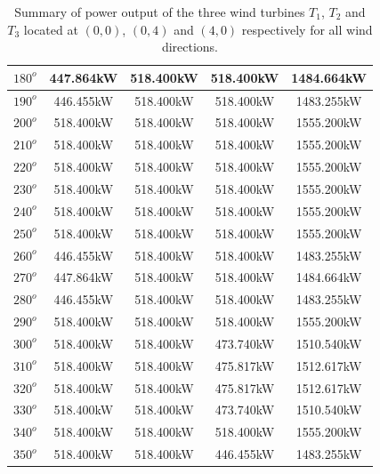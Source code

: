 \begin{table}[H]
\begin{tabular}{|c|c|c|c|c|}
	        $180^{o}$ & 447.864kW & 518.400kW & 518.400kW & 1484.664kW  \\
	        \hline
	        $190^{o}$ & 446.455kW & 518.400kW & 518.400kW & 1483.255kW  \\
	        \hline
	        $200^{o}$ & 518.400kW & 518.400kW & 518.400kW & 1555.200kW  \\
	        \hline
	        $210^{o}$ & 518.400kW & 518.400kW & 518.400kW & 1555.200kW  \\
	        \hline
	        $220^{o}$ & 518.400kW & 518.400kW & 518.400kW & 1555.200kW  \\
	        \hline
	        $230^{o}$ & 518.400kW & 518.400kW & 518.400kW & 1555.200kW  \\
	        \hline
	        $240^{o}$ & 518.400kW & 518.400kW & 518.400kW & 1555.200kW  \\
	        \hline
	        $250^{o}$ & 518.400kW & 518.400kW & 518.400kW & 1555.200kW  \\
	        \hline
	        $260^{o}$ & 446.455kW & 518.400kW & 518.400kW & 1483.255kW  \\
	        \hline
	        $270^{o}$ & 447.864kW & 518.400kW & 518.400kW & 1484.664kW   \\
	        \hline
	        $280^{o}$ & 446.455kW & 518.400kW & 518.400kW & 1483.255kW  \\
	        \hline
	        $290^{o}$ & 518.400kW & 518.400kW & 518.400kW & 1555.200kW  \\
	        \hline
	        $300^{o}$ & 518.400kW & 518.400kW & 473.740kW & 1510.540kW  \\
	        \hline
	        $310^{o}$ & 518.400kW & 518.400kW & 475.817kW & 1512.617kW  \\
	        \hline
	        $320^{o}$ & 518.400kW & 518.400kW & 475.817kW & 1512.617kW  \\
	        \hline
	        $330^{o}$ & 518.400kW & 518.400kW & 473.740kW & 1510.540kW  \\
	        \hline
	        $340^{o}$ & 518.400kW & 518.400kW & 518.400kW & 1555.200kW  \\
	        \hline
	        $350^{o}$ & 518.400kW & 518.400kW & 446.455kW & 1483.255kW  \\      
	        \hline
	    \end{tabular}
	    \caption{Summary of power output of the three wind turbines $T_1$, $T_2$ and $T_3$ located at $(0,0)$, $(0,4)$ and $(4,0)$ respectively for all wind directions.}
	    \label{summaryBest3b}
	\end{table}
	\doublespacing
	
